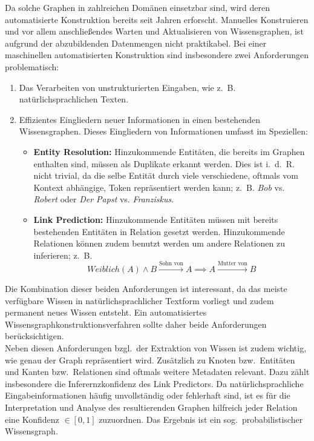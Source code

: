 \documentclass[11pt, a4paper]{scrreprt}
\begin{document}
Da solche Graphen in zahlreichen Domänen einsetzbar sind, wird deren automatisierte Konstruktion bereits seit Jahren erforscht.
Manuelles Konstruieren und vor allem anschließendes Warten und Aktualisieren von Wissensgraphen, ist aufgrund der abzubildenden Datenmengen nicht praktikabel.
Bei einer maschinellen automatisierten Konstruktion sind insbesondere zwei Anforderungen problematisch:
\begin{enumerate}
	\item Das Verarbeiten von unstrukturierten Eingaben, wie z.~B. natürlichsprachlichen Texten.
	\item Effizientes Eingliedern neuer Informationen in einen bestehenden Wissensgraphen.
		Dieses Eingliedern von Informationen umfasst im Speziellen:
		\begin{itemize}
			\item \textbf{Entity Resolution:}
				Hinzukommende Entitäten, die bereits im Graphen enthalten sind, müssen als Duplikate erkannt werden.
				Dies ist i.~d.~R. nicht trivial, da die selbe Entität durch viele verschiedene, oftmals vom Kontext abhängige, Token repräsentiert werden kann;
				z.~B. \textit{Bob} vs. \textit{Robert} oder \textit{Der Papst} vs. \textit{Franziskus}.
			\item \textbf{Link Prediction:}
				Hinzukommende Entitäten müssen mit bereits bestehenden Entitäten in Relation gesetzt werden.
				Hinzukommende Relationen können zudem benutzt werden um andere Relationen zu inferieren;
				z.~B. $$Weiblich(A) \land B \xrightarrow{\text{Sohn~von}} A \implies A \xrightarrow{\text{Mutter~von}} B$$
		\end{itemize}
\end{enumerate}

Die Kombination dieser beiden Anforderungen ist interessant, da das meiste verfügbare Wissen in natürlichsprachlicher Textform vorliegt und zudem permanent neues Wissen entsteht.
Ein automatisiertes Wissensgraphkonstruktionsverfahren sollte daher beide Anforderungen berücksichtigen.\\

Neben diesen Anforderungen bzgl.\ der Extraktion von Wissen ist zudem wichtig, wie genau der Graph repräsentiert wird.
Zusätzlich zu Knoten bzw.\ Entitäten und Kanten bzw.\ Relationen sind oftmals weitere Metadaten relevant.
Dazu zählt insbesondere die Inferernzkonfidenz des Link Predictors.
Da natürlichsprachliche Eingabeinformationen häufig unvollständig oder fehlerhaft sind, ist es für die Interpretation und Analyse des resultierenden Graphen hilfreich jeder Relation eine Konfidenz $\in [0, 1]$ zuzuordnen.
Das Ergebnis ist ein sog.\ probabilistischer Wissensgraph.
\end{document}
